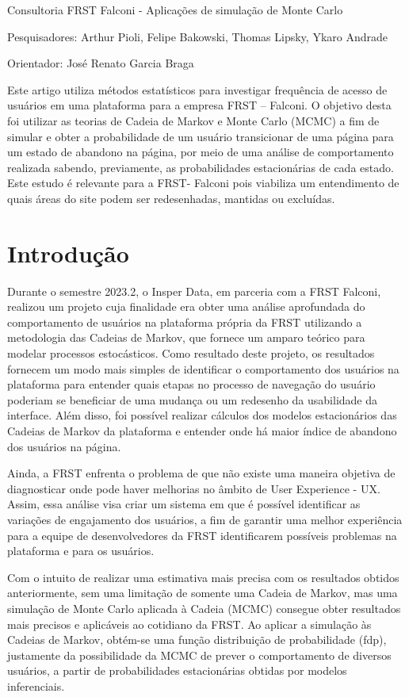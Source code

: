 \relatorio
{Consultoria FRST Falconi - Aplicações de simulação de Monte Carlo}
{
    \noindent Pesquisadores: 
    Arthur Pioli,
    Felipe Bakowski,
    Thomas Lipsky,
    Ykaro Andrade
    
    \noindent Orientador: José Renato Garcia Braga
}
{
   Este artigo utiliza métodos estatísticos para investigar frequência de acesso de usuários em uma plataforma para a empresa FRST – Falconi. O objetivo desta foi utilizar as teorias de Cadeia de Markov e Monte Carlo (MCMC) a fim de simular e obter a probabilidade de um usuário transicionar de uma página para um estado de abandono na página, por meio de uma análise de comportamento realizada sabendo, previamente, as probabilidades estacionárias de cada estado. Este estudo é relevante para a FRST- Falconi pois viabiliza um entendimento de quais áreas do site podem ser redesenhadas, mantidas ou excluídas. 
}

\section{Introdução}

    Durante o semestre 2023.2, o Insper Data, em parceria com a FRST Falconi, realizou um projeto cuja finalidade era obter uma análise aprofundada do comportamento de usuários na plataforma própria da FRST utilizando a metodologia das Cadeias de Markov, que fornece um amparo teórico para modelar processos estocásticos. Como resultado deste projeto, os resultados fornecem um modo mais simples de identificar o comportamento dos usuários na plataforma para entender quais etapas no processo de navegação do usuário poderiam se beneficiar de uma mudança ou um redesenho da usabilidade da interface. Além disso, foi possível realizar cálculos dos modelos estacionários das Cadeias de Markov da plataforma e entender onde há maior índice de abandono dos usuários na página.

Ainda, a FRST enfrenta o problema de que não existe uma maneira objetiva de diagnosticar onde pode haver melhorias no âmbito de User Experience - UX. Assim, essa análise visa criar um sistema em que é possível identificar as variações de engajamento dos usuários, a fim de garantir uma melhor experiência para a equipe de desenvolvedores da FRST identificarem possíveis problemas na plataforma e para os usuários.

Com o intuito de realizar uma estimativa mais precisa com os resultados obtidos anteriormente, sem uma limitação de somente uma Cadeia de Markov, mas uma simulação de Monte Carlo aplicada à Cadeia (MCMC) consegue obter resultados mais precisos e aplicáveis ao cotidiano da FRST. Ao aplicar a simulação às Cadeias de Markov, obtém-se uma função distribuição de probabilidade (fdp), justamente da possibilidade da MCMC de prever o comportamento de diversos usuários, a partir de probabilidades estacionárias obtidas por modelos inferenciais.

